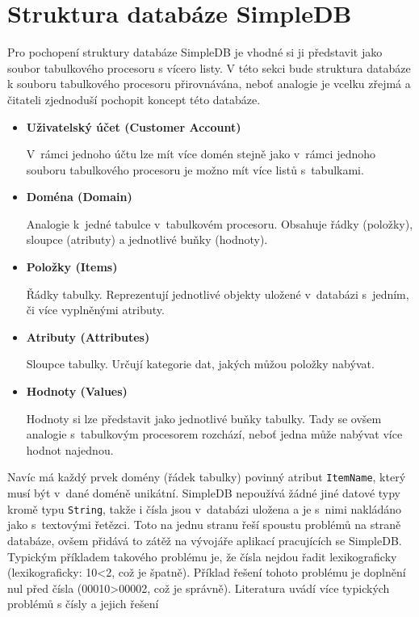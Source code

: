 \documentclass[oneside,12pt]{fithesis2}
\begin{document}
\section{Struktura databáze SimpleDB}\label{simpleDBArchitecture}
Pro pochopení struktury databáze SimpleDB je vhodné si ji představit jako soubor tabulkového procesoru s vícero listy\cite[kapitola Amazon SimpleDB Concepts]{simpledbDeveloper}. V této sekci bude struktura databáze k souboru tabulkového procesoru přirovnávána, neboť analogie je vcelku zřejmá a čitateli zjednoduší pochopit koncept této databáze.
\begin{itemize}
 \item \textbf{Uživatelský účet (Customer Account)}
 
 V~rámci jednoho účtu lze mít více domén stejně jako v~rámci jednoho souboru tabulkového procesoru je možno mít více listů s~tabulkami.
 \item \textbf{Doména (Domain)}
 
 Analogie k~jedné tabulce v~tabulkovém procesoru. Obsahuje řádky (položky), sloupce (atributy) a jednotlivé buňky (hodnoty).
 \item \textbf{Položky (Items)}
 
 Řádky tabulky. Reprezentují jednotlivé objekty uložené v~databázi s~jedním, či více vyplněnými atributy.
 \item \textbf{Atributy (Attributes)}
 
 Sloupce tabulky. Určují kategorie dat, jakých můžou položky nabývat.
 
 \item \textbf{Hodnoty (Values)}
 
 Hodnoty si lze představit jako jednotlivé buňky tabulky. Tady se ovšem analogie s~tabulkovým procesorem rozchází, neboť jedna  může nabývat více hodnot najednou.
 
\end{itemize}
Navíc má každý prvek domény (řádek tabulky) povinný atribut \verb<ItemName<, který musí být v~dané doméně unikátní.
\label{allStrings}
SimpleDB nepoužívá žádné jiné datové typy kromě typu \verb<String<, takže i čísla jsou v~databázi uložena a je s~nimi nakládáno jako s~textovými řetězci. Toto na jednu stranu řeší spoustu problémů na straně databáze, ovšem přidává to zátěž na vývojáře aplikací pracujících se SimpleDB. Typickým příkladem takového problému je, že čísla nejdou řadit lexikograficky (lexikograficky: 10<2, což je špatně). Příklad řešení tohoto problému je doplnění nul před čísla (00010>00002, což je správně). Literatura uvádí více typických problémů s čísly a jejich řešení \cite[strana 46, Working with Numerical Data]{simpledbDeveloper}
\end{document}
